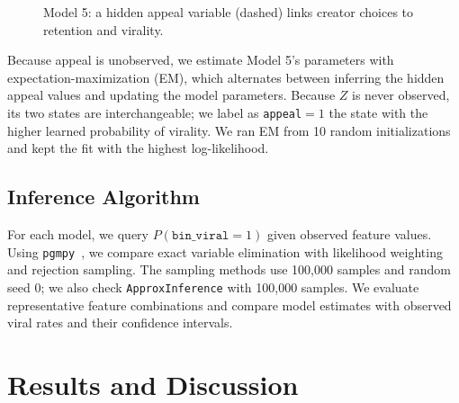 \documentclass{article}
\begin{document}
\begin{figure}[H]
  \centering
  \caption{Model 5: a hidden appeal variable (dashed) links creator choices
  to retention and virality.}
  \label{fig:model-latent}
\end{figure}

Because appeal is unobserved, we estimate Model 5's parameters with
expectation-maximization (EM), which alternates between inferring the hidden
appeal values and updating the model parameters. Because $Z$ is never
observed, its two states are interchangeable; we label as \texttt{appeal}$=1$
the state with the higher learned probability of virality. We ran EM from 10
random initializations and kept the fit with the highest log-likelihood.

\subsection{Inference Algorithm}
For each model, we query $P(\texttt{bin\_viral}=1)$ given observed feature
values. Using \texttt{pgmpy}~\citep{pgmpy}, we compare exact variable elimination with
likelihood weighting and rejection sampling. The sampling methods use
100,000 samples and random seed 0; we also check \texttt{ApproxInference}
with 100,000 samples. We evaluate representative feature combinations and
compare model estimates with observed viral rates and their confidence
intervals.

\section{Results and Discussion}
\end{document}
